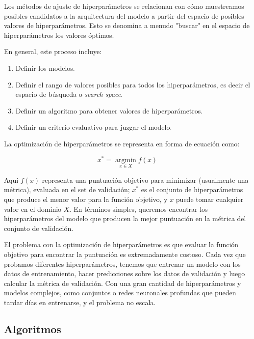 \documentclass[a4paper,12pt]{article}
\begin{document}
Los métodos de ajuste de hiperparámetros se relacionan con cómo muestreamos posibles candidatos a la arquitectura del modelo a partir del espacio de posibles valores de hiperparámetros. Esto se denomina a menudo "buscar" en el espacio de hiperparámetros los valores óptimos.

En general, este proceso incluye:

\begin{enumerate}
	\item Definir los modelos.
	\item Definir el rango de valores posibles para todos los hiperparámetros, es decir el espacio de búsqueda o \textit{search space}.
	\item Definir un algoritmo para obtener valores de hiperparámetros.
	\item Definir un criterio evaluativo para juzgar el modelo.
\end{enumerate}

La optimización de hiperparámetros se representa en forma de ecuación como:

$$x^* = \operatorname*{argmin}_{x \in X} f(x)$$

Aquí $f(x)$ representa una puntuación objetivo para minimizar (usualmente una métrica), evaluada en el set de validación; $x^*$ es el conjunto de hiperparámetros que produce el menor valor para la función objetivo, y $x$ puede tomar cualquier valor en el dominio $X$. En términos simples, queremos encontrar los hiperparámetros del modelo que producen la mejor puntuación en la métrica del conjunto de validación.

El problema con la optimización de hiperparámetros es que evaluar la función objetivo para encontrar la puntuación es extremadamente costoso. Cada vez que probamos diferentes hiperparámetros, tenemos que entrenar un modelo con los datos de entrenamiento, hacer predicciones sobre los datos de validación y luego calcular la métrica de validación. Con una gran cantidad de hiperparámetros y modelos complejos, como conjuntos o redes neuronales profundas que pueden tardar días en entrenarse, y el problema no escala.

\subsection{Algoritmos} \label{algo-hp}
\end{document}
